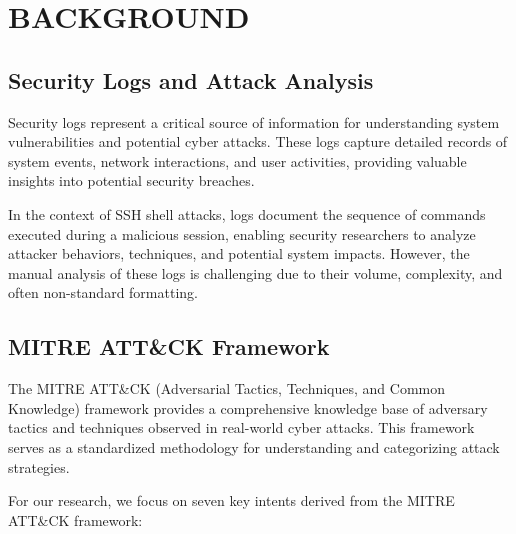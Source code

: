 

\section{BACKGROUND}


    \subsection{Security Logs and Attack Analysis}
    
    Security logs represent a critical source of information for understanding system vulnerabilities and potential cyber attacks. These logs capture detailed records of system events, network interactions, and user activities, providing valuable insights into potential security breaches.

    In the context of SSH shell attacks, logs document the sequence of commands executed during a malicious session, enabling security researchers to analyze attacker behaviors, techniques, and potential system impacts. However, the manual analysis of these logs is challenging due to their volume, complexity, and often non-standard formatting.

    \subsection{MITRE ATT\&CK Framework}
    
    The MITRE ATT\&CK (Adversarial Tactics, Techniques, and Common Knowledge) framework provides a comprehensive knowledge base of adversary tactics and techniques observed in real-world cyber attacks. This framework serves as a standardized methodology for understanding and categorizing attack strategies.

    \noindent For our research, we focus on seven key intents derived from the MITRE ATT\&CK framework:

